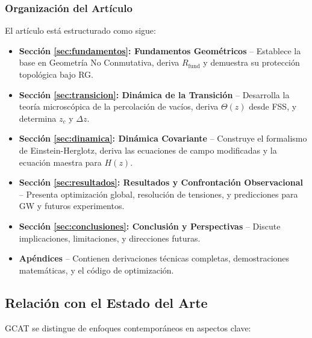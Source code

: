 \documentclass[12pt, a4paper]{article}
\theoremstyle{plain}
\theoremstyle{definition}
\begin{document}
\subsubsection{Organización del Artículo}

El artículo está estructurado como sigue:

\begin{itemize}
    \item \textbf{Sección \ref{sec:fundamentos}: Fundamentos Geométricos} – 
          Establece la base en Geometría No Conmutativa, deriva $R_{\text{fund}}$ 
          y demuestra su protección topológica bajo RG.
    
    \item \textbf{Sección \ref{sec:transicion}: Dinámica de la Transición} – 
          Desarrolla la teoría microscópica de la percolación de vacíos, deriva 
          $\Theta(z)$ desde FSS, y determina $z_c$ y $\Delta z$.
    
    \item \textbf{Sección \ref{sec:dinamica}: Dinámica Covariante} – Construye 
          el formalismo de Einstein-Herglotz, deriva las ecuaciones de campo 
          modificadas y la ecuación maestra para $H(z)$.
    
    \item \textbf{Sección \ref{sec:resultados}: Resultados y Confrontación Observacional} – 
          Presenta optimización global, resolución de tensiones, y predicciones 
          para GW y futuros experimentos.
    
    \item \textbf{Sección \ref{sec:conclusiones}: Conclusión y Perspectivas} – 
          Discute implicaciones, limitaciones, y direcciones futuras.
    
    \item \textbf{Apéndices} – Contienen derivaciones técnicas completas, 
          demostraciones matemáticas, y el código de optimización.
\end{itemize}

\subsection{Relación con el Estado del Arte}

GCAT se distingue de enfoques contemporáneos en aspectos clave:
\end{document}

